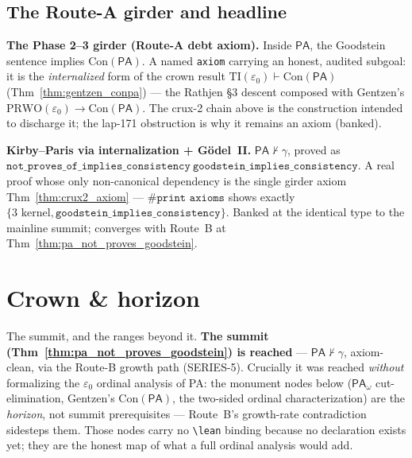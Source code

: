 \section{The Route-A girder and headline}

\begin{theorem}\label{thm:crux2_axiom}
  \notready
\textbf{The Phase 2--3 girder (Route-A debt axiom).}  Inside \(\mathsf{PA}\), the Goodstein sentence
implies \(\mathrm{Con}(\mathsf{PA})\).  A named \texttt{axiom} carrying an honest, audited subgoal: it
is the \emph{internalized} form of the crown result \(\mathrm{TI}(\varepsilon_0)\vdash
\mathrm{Con}(\mathsf{PA})\) (Thm~\ref{thm:gentzen_conpa}) --- the Rathjen §3 descent composed with Gentzen's
\(\mathrm{PRWO}(\varepsilon_0)\to\mathrm{Con}(\mathsf{PA})\).  The crux-2 chain above is the construction
intended to discharge it; the lap-171 obstruction is why it remains an axiom (banked).
\end{theorem}

\begin{theorem}\label{thm:routeA_headline}
  \notready
\textbf{Kirby--Paris via internalization + Gödel~II.}  \(\mathsf{PA}\nvdash\gamma\), proved as
\(\texttt{not\_proves\_of\_implies\_consistency}\ \texttt{goodstein\_implies\_consistency}\).  A real
proof whose only non-canonical dependency is the single girder axiom Thm~\ref{thm:crux2_axiom} ---
\(\texttt{\#print axioms}\) shows exactly \(\{\text{3 kernel}, \texttt{goodstein\_implies\_consistency}\}\).
Banked at the identical type to the mainline summit; converges with Route~B at
Thm~\ref{thm:pa_not_proves_goodstein}.
\end{theorem}


\chapter{Crown \& horizon}\label{chp:crown}

The summit, and the ranges beyond it.  \textbf{The summit (Thm~\ref{thm:pa_not_proves_goodstein}) is
reached} --- \(\mathsf{PA}\nvdash\gamma\), axiom-clean, via the Route-B growth path (SERIES-5).
Crucially it was reached \emph{without} formalizing the \(\varepsilon_0\) ordinal analysis of PA: the
monument nodes below (\(\mathsf{PA}_\omega\) cut-elimination, Gentzen's \(\mathrm{Con}(\mathsf{PA})\),
the two-sided ordinal characterization) are the \emph{horizon}, not summit prerequisites --- Route~B's
growth-rate contradiction sidesteps them.  Those nodes carry no \texttt{\textbackslash lean} binding
because no declaration exists yet; they are the honest map of what a full ordinal analysis would add.

